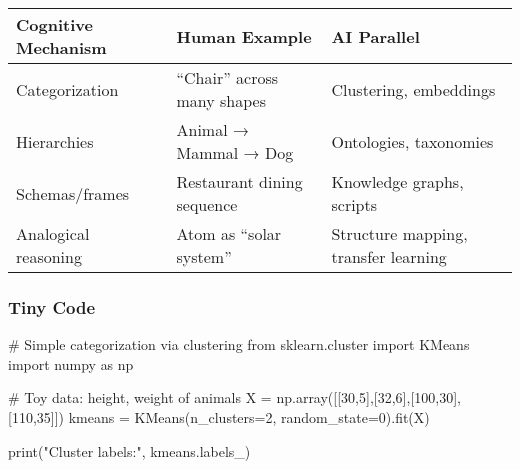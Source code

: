 \documentclass[
  letterpaper,
  DIV=11,
  numbers=noendperiod]{scrreprt}
\newenvironment{Shaded}{\begin{snugshade}}{\end{snugshade}}
\newcommand{\BuiltInTok}[1]{\textcolor[rgb]{0.00,0.23,0.31}{#1}}
\newcommand{\CommentTok}[1]{\textcolor[rgb]{0.37,0.37,0.37}{#1}}
\newcommand{\DecValTok}[1]{\textcolor[rgb]{0.68,0.00,0.00}{#1}}
\newcommand{\ImportTok}[1]{\textcolor[rgb]{0.00,0.46,0.62}{#1}}
\newcommand{\NormalTok}[1]{\textcolor[rgb]{0.00,0.23,0.31}{#1}}
\newcommand{\OperatorTok}[1]{\textcolor[rgb]{0.37,0.37,0.37}{#1}}
\newcommand{\StringTok}[1]{\textcolor[rgb]{0.13,0.47,0.30}{#1}}
\begin{document}
\begin{longtable}[]{@{}
  >{\raggedright\arraybackslash}p{}
  >{\raggedright\arraybackslash}p{}
  >{\raggedright\arraybackslash}p{}@{}}
\toprule\noalign{}
\begin{minipage}[b]{\linewidth}\raggedright
Cognitive Mechanism
\end{minipage} & \begin{minipage}[b]{\linewidth}\raggedright
Human Example
\end{minipage} & \begin{minipage}[b]{\linewidth}\raggedright
AI Parallel
\end{minipage} \\
\midrule\noalign{}
\endhead
\bottomrule\noalign{}
\endlastfoot
Categorization & ``Chair'' across many shapes & Clustering,
embeddings \\
Hierarchies & Animal → Mammal → Dog & Ontologies, taxonomies \\
Schemas/frames & Restaurant dining sequence & Knowledge graphs,
scripts \\
Analogical reasoning & Atom as ``solar system'' & Structure mapping,
transfer learning \\
\end{longtable}

\subsubsection{Tiny Code}\label{tiny-code-47}

\begin{Shaded}
\begin{Highlighting}[]
\CommentTok{\# Simple categorization via clustering}
\ImportTok{from}\NormalTok{ sklearn.cluster }\ImportTok{import}\NormalTok{ KMeans}
\ImportTok{import}\NormalTok{ numpy }\ImportTok{as}\NormalTok{ np}

\CommentTok{\# Toy data: height, weight of animals}
\NormalTok{X }\OperatorTok{=}\NormalTok{ np.array([[}\DecValTok{30}\NormalTok{,}\DecValTok{5}\NormalTok{],[}\DecValTok{32}\NormalTok{,}\DecValTok{6}\NormalTok{],[}\DecValTok{100}\NormalTok{,}\DecValTok{30}\NormalTok{],[}\DecValTok{110}\NormalTok{,}\DecValTok{35}\NormalTok{]])}
\NormalTok{kmeans }\OperatorTok{=}\NormalTok{ KMeans(n\_clusters}\OperatorTok{=}\DecValTok{2}\NormalTok{, random\_state}\OperatorTok{=}\DecValTok{0}\NormalTok{).fit(X)}

\BuiltInTok{print}\NormalTok{(}\StringTok{"Cluster labels:"}\NormalTok{, kmeans.labels\_)}
\end{Highlighting}
\end{Shaded}
\end{document}
